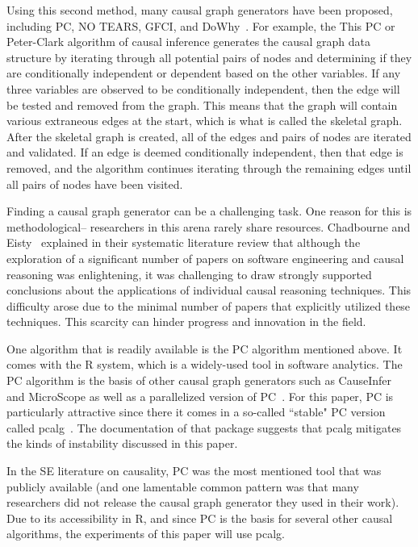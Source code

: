 \documentclass[]{svjour3}
\begin{document}
Using this second method, many  causal graph generators have been proposed, including   
PC, NO TEARS, GFCI, and DoWhy~\cite{Spirtes_book,Zheng2018DAGsWN,%
pmlr-v52-ogarrio16,dowhypaper,dowhy1,dowhypaper2}.
For example, the
This   PC or Peter-Clark algorithm of causal inference\cite{PCParalell}\cite{MicroScope}\cite{PCALG1}  generates the causal graph data structure by iterating through all potential pairs of nodes and determining if they are conditionally independent or dependent based on the other variables.  If any three variables are observed to be conditionally independent, then the edge will be tested and removed from the graph.  This means that the graph will contain various extraneous edges at the start, which is what is called the skeletal graph.  After the skeletal graph is created, all of the edges and pairs of nodes are iterated and validated.  If an edge is deemed conditionally independent, then that edge is removed, and the algorithm continues iterating through the remaining edges until all pairs of nodes have been visited.



Finding a causal graph 
generator can be a challenging task.
One reason for this is methodological-- 
researchers in this arena rarely
share resources.  
Chadbourne and Eisty~\cite{10197835} explained in their systematic literature review that although the exploration of a significant number of papers on software engineering and causal reasoning was enlightening, it was challenging to draw strongly supported conclusions about the applications of individual causal reasoning techniques. 
This difficulty arose due to the minimal number of papers that explicitly utilized these techniques. 
This scarcity can hinder progress and innovation in the field. 

One algorithm that is readily available
is the PC algorithm mentioned above.
It comes with the   R system, which is a  widely-used tool
in software analytics.  
The PC algorithm is the basis of other causal graph generators such as CauseInfer and  MicroScope\cite{CauseInfer,MicroScope,kalisch2007estimating} 
as well as a parallelized version of PC~\cite{PCParalell}. 
For this paper, PC is particularly attractive since
there it comes in a so-called   ``stable" PC version called pcalg~\cite{PCALG1,colombo2013orderindependent}. The documentation of that 
package suggests that pcalg mitigates the kinds of instability discussed in this paper.

In the SE literature on causality, PC was the most mentioned tool
 that was publicly available (and one lamentable common pattern was that many researchers did not release the causal graph generator they used in their work).
Due to its accessibility in R, and  since PC is  the basis for
 several other causal algorithms, the experiments of this paper will use pcalg.
\end{document}
